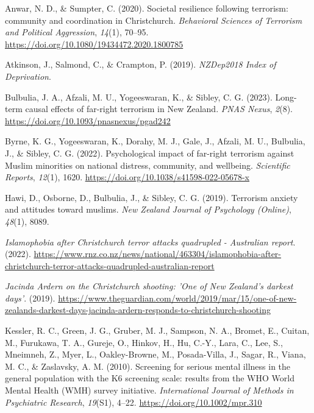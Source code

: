 \documentclass[
  man,
  longtable,
  nolmodern,
  notxfonts,
  notimes,
  colorlinks=true,linkcolor=blue,citecolor=blue,urlcolor=blue]{apa7}
\newlength{\cslhangindent}
\newenvironment{CSLReferences}[2] %
 {\begin{list}{}{%
  \setlength{\itemindent}{0pt}
  \setlength{\leftmargin}{0pt}
  \setlength{\parsep}{0pt}
  \ifodd #1
   \setlength{\leftmargin}{\cslhangindent}
   \setlength{\itemindent}{-1\cslhangindent}
  \fi
  \setlength{\itemsep}{#2\baselineskip}}}
 {\end{list}}
\begin{document}
\label{refs}
\begin{CSLReferences}{1}{0}
Anwar, N. D., \& Sumpter, C. (2020). Societal resilience following
terrorism: community and coordination in Christchurch. \emph{Behavioral
Sciences of Terrorism and Political Aggression}, \emph{14}(1), 70--95.
\url{https://doi.org/10.1080/19434472.2020.1800785}

Atkinson, J., Salmond, C., \& Crampton, P. (2019). \emph{NZDep2018 Index
of Deprivation}.

Bulbulia, J. A., Afzali, M. U., Yogeeswaran, K., \& Sibley, C. G.
(2023). Long-term causal effects of far-right terrorism in New Zealand.
\emph{PNAS Nexus}, \emph{2}(8).
\url{https://doi.org/10.1093/pnasnexus/pgad242}

Byrne, K. G., Yogeeswaran, K., Dorahy, M. J., Gale, J., Afzali, M. U.,
Bulbulia, J., \& Sibley, C. G. (2022). Psychological impact of far-right
terrorism against Muslim minorities on national distress, community, and
wellbeing. \emph{Scientific Reports}, \emph{12}(1), 1620.
\url{https://doi.org/10.1038/s41598-022-05678-x}

Hawi, D., Osborne, D., Bulbulia, J., \& Sibley, C. G. (2019). Terrorism
anxiety and attitudes toward muslims. \emph{New Zealand Journal of
Psychology (Online)}, \emph{48}(1), 8089.

\emph{Islamophobia after {C}hristchurch terror attacks quadrupled -
{A}ustralian report}. (2022).
\url{https://www.rnz.co.nz/news/national/463304/islamophobia-after-christchurch-terror-attacks-quadrupled-australian-report}

\emph{Jacinda {A}rdern on the {C}hristchurch shooting: 'One of {N}ew
{Z}ealand's darkest days'}. (2019).
\url{https://www.theguardian.com/world/2019/mar/15/one-of-new-zealands-darkest-days-jacinda-ardern-responds-to-christchurch-shooting}

Kessler, R. C., Green, J. G., Gruber, M. J., Sampson, N. A., Bromet, E.,
Cuitan, M., Furukawa, T. A., Gureje, O., Hinkov, H., Hu, C.-Y., Lara,
C., Lee, S., Mneimneh, Z., Myer, L., Oakley-Browne, M., Posada-Villa,
J., Sagar, R., Viana, M. C., \& Zaslavsky, A. M. (2010). Screening for
serious mental illness in the general population with the K6 screening
scale: results from the WHO World Mental Health (WMH) survey initiative.
\emph{International Journal of Methods in Psychiatric Research},
\emph{19}(S1), 4--22. \url{https://doi.org/10.1002/mpr.310}


\end{CSLReferences}
\end{document}
